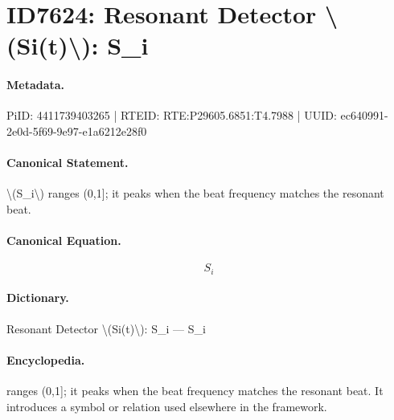 \section*{ID7624: Resonant Detector \textbackslash{}(Si(t)\textbackslash{}): S\_i}
\paragraph{Metadata.}
PiID: 4411739403265 | RTEID: RTE:P29605.6851:T4.7988 | UUID: ec640991-2e0d-5f69-9e97-e1a6212e28f0

\paragraph{Canonical Statement.}
\textbackslash{}(S\_i\textbackslash{}) ranges (0,1]; it peaks when the beat frequency matches the resonant beat.

\paragraph{Canonical Equation.}
\[
S_i
\]

\paragraph{Dictionary.}
Resonant Detector \textbackslash{}(Si(t)\textbackslash{}): S\_i — S\_i

\paragraph{Encyclopedia.}
ranges (0,1]; it peaks when the beat frequency matches the resonant beat. It introduces a symbol or relation used elsewhere in the framework.
